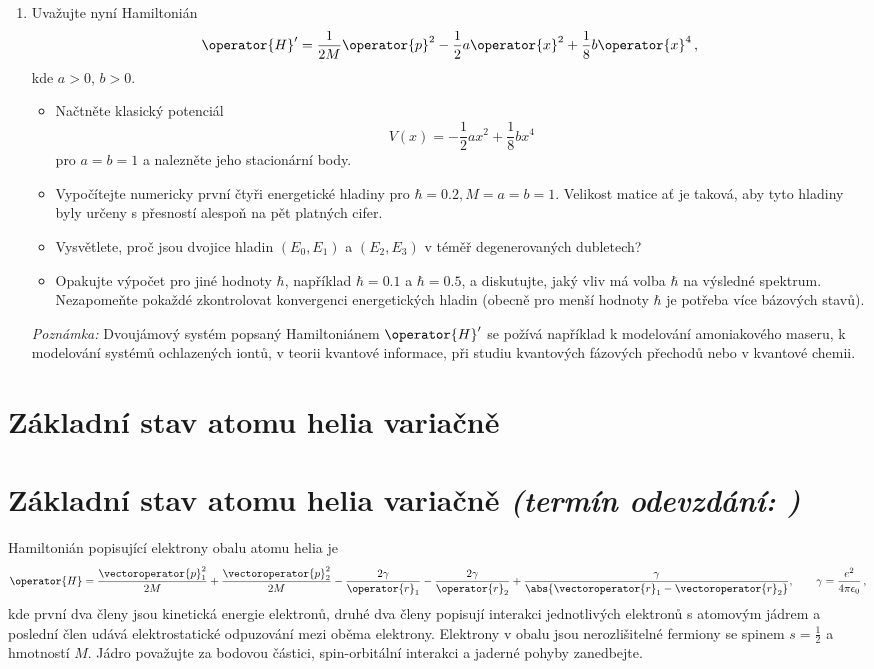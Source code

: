\documentclass[a4paper,11pt,twoside]{book}
\def\np{\newpage}
\newcommand{\exercise}[2][]{\ifthenelse{\isempty{#1}}
	{\np\section{#2}}
	{\np\section[#2]{{#2} \small{\it{(termín odevzdání: {#1})}}}}
}
\begin{document}
\begin{enumerate}
    \item
        Uvažujte nyní Hamiltonián
        \begin{equation*}
            \operator{H}'=\frac{1}{2M}\operator{p}^{2}-\frac{1}{2}a\operator{x}^{2}+\frac{1}{8}b\operator{x}^{4}\,,
        \end{equation*}
        kde $a>0$, $b>0$.
        
        \begin{itemize}
        \item 
            Načtněte klasický potenciál
            \begin{equation*}
                V(x)=-\frac{1}{2}ax^{2}+\frac{1}{8}bx^{4}
            \end{equation*}
            pro $a=b=1$ a nalezněte jeho stacionární body.
        \item 
            Vypočítejte numericky první čtyři energetické hladiny pro $\hbar=0.2,M=a=b=1$.
            Velikost matice ať je taková, aby tyto hladiny byly určeny s přesností alespoň na pět platných cifer.
        \item 
            Vysvětlete, proč jsou dvojice hladin $(E_{0}, E_{1})$ a $(E_{2}, E_{3})$ v téměř degenerovaných dubletech?        
        \item 
            Opakujte výpočet pro jiné hodnoty $\hbar$, například $\hbar=0.1$ a $\hbar=0.5$, a diskutujte, jaký vliv má volba $\hbar$ na výsledné spektrum.
            Nezapomeňte pokaždé zkontrolovat konvergenci energetických hladin (obecně pro menší hodnoty $\hbar$ je potřeba více bázových stavů).
        \end{itemize}		
        
        \emph{Poznámka:} Dvoujámový systém popsaný Hamiltoniánem $\operator{H}'$ se požívá například k modelování amoniakového maseru, k modelování systémů ochlazených iontů, v teorii kvantové informace, při studiu kvantových fázových přechodů nebo v kvantové chemii.
            
    \end{enumerate}

\exercise{Základní stav atomu helia variačně}
Hamiltonián popisující elektrony obalu atomu helia je
\begin{equation*}
    \operator{H}=\frac{\vectoroperator{p}_{1}^{2}}{2M}
        +\frac{\vectoroperator{p}_{2}^{2}}{2M}
        -\frac{2\gamma}{\operator{r}_{1}}
        -\frac{2\gamma}{\operator{r}_{2}}
        +\frac{\gamma}{\abs{\vectoroperator{r}_{1}-\vectoroperator{r}_{2}}},\qquad \gamma=\frac{e^{2}}{4\pi\epsilon_{0}}\,,
\end{equation*}
kde první dva členy jsou kinetická energie elektronů, druhé dva členy popisují interakci jednotlivých elektronů s atomovým jádrem a poslední člen udává elektrostatické odpuzování mezi oběma elektrony.
Elektrony v obalu jsou nerozlišitelné fermiony se spinem $s=\frac{1}{2}$ a hmotností $M$.
Jádro považujte za bodovou částici, spin-orbitální interakci a jaderné pohyby zanedbejte.
\end{document}
